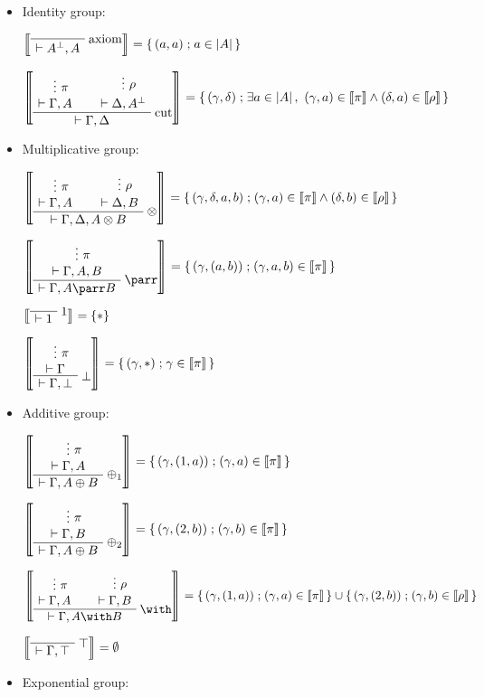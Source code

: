 \begin{itemize}
\item
  Identity group:

\(\sem{
\LabelRule{\rulename{axiom}}
\NulRule{ \vdash A\orth, A }
\DisplayProof}=\set{(a,a)}{a\in\web A}\)

\(\sem{
\AxRule{}
\VdotsRule{ \pi }{ \vdash \Gamma, A }
\AxRule{}
\VdotsRule{ \rho }{ \vdash \Delta, A\orth }
\LabelRule{ \rulename{cut} }
\BinRule{ \vdash \Gamma, \Delta }
\DisplayProof} = \set{(\gamma,\delta)}{\exists a\in\web A,\ (\gamma,a)\in\sem\pi\land(\delta,a)\in\sem\rho}\)

\item Multiplicative group:

\(\sem{
\AxRule{}
\VdotsRule{ \pi }{ \vdash \Gamma, A }
\AxRule{}
\VdotsRule{ \rho }{ \vdash \Delta, B }
\LabelRule{ \tens }
\BinRule{ \vdash \Gamma, \Delta, A \tens B }
\DisplayProof} =
\set{(\gamma,\delta,a,b)}{(\gamma,a)\in\sem\pi\land(\delta,b)\in\sem\rho}
\)

\(\sem{
\AxRule{ }
\VdotsRule{ \pi }{ \vdash \Gamma, A, B }
\LabelRule{ \parr }
\UnaRule{ \vdash \Gamma, A \parr B }
\DisplayProof} =  \set{(\gamma,(a,b))}{(\gamma,a,b)\in\sem\pi}\)

\(\sem{
\LabelRule{ \one }
\NulRule{ \vdash \one }
\DisplayProof} = \{ * \}\)

\(\sem{
\AxRule{}
\VdotsRule{ \pi }{ \vdash \Gamma }
\LabelRule{ \bot }
\UnaRule{ \vdash \Gamma, \bot }
\DisplayProof} = \set{(\gamma,*)}{\gamma\in\sem\pi}\)

\item Additive group:

\(\sem{ \AxRule{}
\VdotsRule{ \pi }{ \vdash \Gamma, A }
\LabelRule{ \plus_1 }
\UnaRule{ \vdash \Gamma, A \plus B }
\DisplayProof} =
\set{(\gamma,(1,a))}{(\gamma,a)\in\sem\pi}
\)

\(\sem{
\AxRule{}
\VdotsRule{ \pi }{ \vdash \Gamma, B }
\LabelRule{ \plus_2 }
\UnaRule{ \vdash \Gamma, A \plus B }
\DisplayProof} = \set{(\gamma,(2,b))}{(\gamma,b)\in\sem\pi}\)

\(\sem{
\AxRule{}
\VdotsRule{ \pi }{ \vdash \Gamma, A }
\AxRule{}
\VdotsRule{ \rho }{ \vdash \Gamma, B }
\LabelRule{ \with }
\BinRule{ \vdash \Gamma, A \with B }
\DisplayProof} = \set{(\gamma,(1,a))}{(\gamma,a)\in\sem\pi} \cup \set{(\gamma,(2,b))}{(\gamma,b)\in\sem\rho}\)

\(\sem{
\LabelRule{ \top }
\NulRule{ \vdash \Gamma, \top }
\DisplayProof} = \emptyset\)

\item Exponential group:


\end{itemize}
